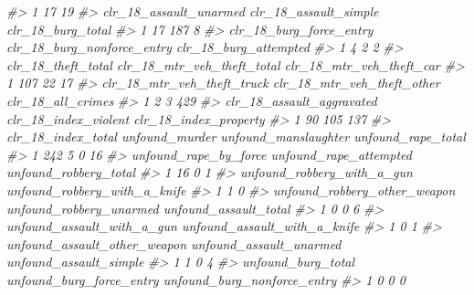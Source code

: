 \documentclass[
  12pt,
]{book}
\newenvironment{Shaded}{\begin{snugshade}}{\end{snugshade}}
\newcommand{\CommentTok}[1]{\textcolor[rgb]{0.37,0.37,0.37}{\textit{#1}}}
\begin{document}
\begin{Shaded}
\begin{Highlighting}[]
\CommentTok{\#\textgreater{} 1                          17                          19}
\CommentTok{\#\textgreater{}   clr\_18\_assault\_unarmed clr\_18\_assault\_simple clr\_18\_burg\_total}
\CommentTok{\#\textgreater{} 1                     17                   187                 8}
\CommentTok{\#\textgreater{}   clr\_18\_burg\_force\_entry clr\_18\_burg\_nonforce\_entry clr\_18\_burg\_attempted}
\CommentTok{\#\textgreater{} 1                       4                          2                     2}
\CommentTok{\#\textgreater{}   clr\_18\_theft\_total clr\_18\_mtr\_veh\_theft\_total clr\_18\_mtr\_veh\_theft\_car}
\CommentTok{\#\textgreater{} 1                107                         22                       17}
\CommentTok{\#\textgreater{}   clr\_18\_mtr\_veh\_theft\_truck clr\_18\_mtr\_veh\_theft\_other clr\_18\_all\_crimes}
\CommentTok{\#\textgreater{} 1                          2                          3               429}
\CommentTok{\#\textgreater{}   clr\_18\_assault\_aggravated clr\_18\_index\_violent clr\_18\_index\_property}
\CommentTok{\#\textgreater{} 1                        90                  105                   137}
\CommentTok{\#\textgreater{}   clr\_18\_index\_total unfound\_murder unfound\_manslaughter unfound\_rape\_total}
\CommentTok{\#\textgreater{} 1                242              5                    0                 16}
\CommentTok{\#\textgreater{}   unfound\_rape\_by\_force unfound\_rape\_attempted unfound\_robbery\_total}
\CommentTok{\#\textgreater{} 1                    16                      0                     1}
\CommentTok{\#\textgreater{}   unfound\_robbery\_with\_a\_gun unfound\_robbery\_with\_a\_knife}
\CommentTok{\#\textgreater{} 1                          1                            0}
\CommentTok{\#\textgreater{}   unfound\_robbery\_other\_weapon unfound\_robbery\_unarmed unfound\_assault\_total}
\CommentTok{\#\textgreater{} 1                            0                       0                     6}
\CommentTok{\#\textgreater{}   unfound\_assault\_with\_a\_gun unfound\_assault\_with\_a\_knife}
\CommentTok{\#\textgreater{} 1                          0                            1}
\CommentTok{\#\textgreater{}   unfound\_assault\_other\_weapon unfound\_assault\_unarmed unfound\_assault\_simple}
\CommentTok{\#\textgreater{} 1                            1                       0                      4}
\CommentTok{\#\textgreater{}   unfound\_burg\_total unfound\_burg\_force\_entry unfound\_burg\_nonforce\_entry}
\CommentTok{\#\textgreater{} 1                  0                        0                           0}

\end{Highlighting}
\end{Shaded}
\end{document}
